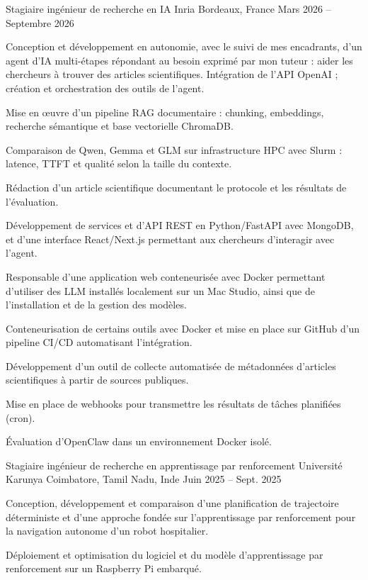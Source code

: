 
\begin{cventries}
  \cventry
    {Stagiaire ingénieur de recherche en IA}
    {Inria}
    {Bordeaux, France}
    {Mars 2026 -- Septembre 2026}
    {
      \begin{cvitems}
        \item {Conception et développement en autonomie, avec le suivi de mes encadrants, d’un agent d’IA multi-étapes répondant au besoin exprimé par mon tuteur : aider les chercheurs à trouver des articles scientifiques. Intégration de l’API OpenAI ; création et orchestration des outils de l’agent.}
        \item {Mise en œuvre d’un pipeline RAG documentaire : chunking, embeddings, recherche sémantique et base vectorielle ChromaDB.}
        \item {Comparaison de Qwen, Gemma et GLM sur infrastructure HPC avec Slurm : latence, TTFT et qualité selon la taille du contexte.}
        \item {Rédaction d’un article scientifique documentant le protocole et les résultats de l’évaluation.}
        \item {Développement de services et d’API REST en Python/FastAPI avec MongoDB, et d’une interface React/Next.js permettant aux chercheurs d’interagir avec l’agent.}
        \item {Responsable d’une application web conteneurisée avec Docker permettant d’utiliser des LLM installés localement sur un Mac Studio, ainsi que de l’installation et de la gestion des modèles.}
        \item {Conteneurisation de certains outils avec Docker et mise en place sur GitHub d’un pipeline CI/CD automatisant l’intégration.}
        \item {Développement d’un outil de collecte automatisée de métadonnées d’articles scientifiques à partir de sources publiques.}
        \item {Mise en place de webhooks pour transmettre les résultats de tâches planifiées (cron).}
        \item {Évaluation d’OpenClaw dans un environnement Docker isolé.}
      \end{cvitems}
    }

  \cventry
    {Stagiaire ingénieur de recherche en apprentissage par renforcement}
    {Université Karunya}
    {Coimbatore, Tamil Nadu, Inde}
    {Juin 2025 -- Sept. 2025}
    {
      \begin{cvitems}
        \item {Conception, développement et comparaison d’une planification de trajectoire déterministe et d’une approche fondée sur l’apprentissage par renforcement pour la navigation autonome d’un robot hospitalier.}
        \item {Déploiement et optimisation du logiciel et du modèle d’apprentissage par renforcement sur un Raspberry Pi embarqué.}
      \end{cvitems}
    }
\end{cventries}
